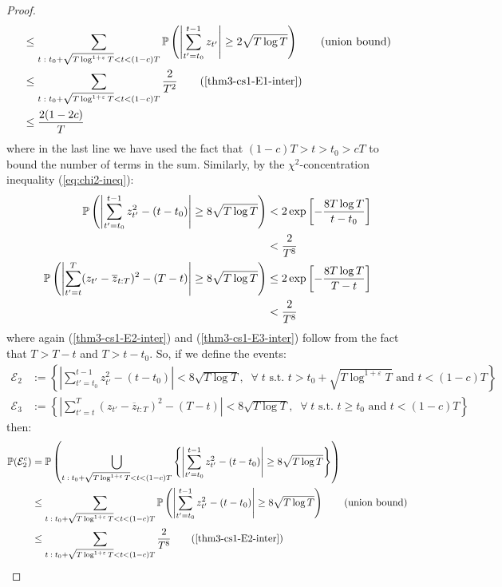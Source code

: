 \documentclass{article}
\newcommand{\sforall}{\;\forall\;}
\begin{document}
\begin{proof}
\begin{align*}
    &\leq \sum_{t\;:\; t_0 + \sqrt{T\log^{1+\varepsilon}T} < t < (1-c)T} \mathbb{P}\left(\left|\sum_{t'=t_0}^{t-1} z_{t'}\right| \geq 2\sqrt{T \log T}\right) \tag{union bound}\\
    &\leq \sum_{t\;:\; t_0 + \sqrt{T\log^{1+\varepsilon}T} < t < (1-c)T} \frac{2}{T^2} \tag{\ref{thm3-cs1-E1-inter}} \\
    &\leq \frac{2(1-2c)}{T}
\end{align*}
where in the last line we have used the fact that $(1-c)T > t > t_0 > cT$ to bound the number of terms in the sum. Similarly, by the $\chi^2$-concentration inequality (\ref{eq:chi2-ineq}):
\begin{align}
    \mathbb{P}\left(\left|\sum_{t'=t_0}^{t-1} z^2_{t'} - (t -t_0)\right| \geq 8\sqrt{T \log T}\right) &< 2 \exp\left[- 
    \frac{8 T \log T}{t-t_0} \right] \notag\\
    &<  \frac{2}{T^8} \label{thm3-cs1-E2-inter}\\
    \mathbb{P}\left(\left|\sum_{t'=t}^T (z_{t'} - \overline{z}_{t:T})^2 - (T-t)\right| \geq 8\sqrt{T \log T}\right) &\leq 2 \exp\left[-\frac{8 T \log T}{T-t} \right] \notag \\
    &<  \frac{2}{T^8} \label{thm3-cs1-E3-inter}
\end{align}
where again (\ref{thm3-cs1-E2-inter}) and (\ref{thm3-cs1-E3-inter}) follow from the fact that $T > T - t$ and $T > t-t_0$. So, if we define the events:
\begin{align*}
    \mathcal{E}_2 &:= \left\{\left|\sum_{t'=t_0}^{t-1} z^2_{t'} - (t -t_0)\right| < 8\sqrt{T \log T}, \; \sforall t \text{ s.t. } t > t_0 + \sqrt{T\log^{1+\varepsilon}T} \text{ and } t < (1-c)T\right\} \\
    \mathcal{E}_3 &:= \left\{\left|\sum_{t'=t}^T (z_{t'} - \overline{z}_{t:T})^2 - (T-t)\right| < 8\sqrt{T \log T}, \; \sforall t \text{ s.t. } t \geq t_0 \text{ and } t < (1-c)T\right\}
\end{align*}
then:
\begin{align*}
    \mathbb{P}(\mathcal{E}^c_2) &= \mathbb{P}\left(\bigcup_{t\;:\; t_0 + \sqrt{T\log^{1+\varepsilon}T} < t < (1-c)T} \left\{\left|\sum_{t'=t_0}^{t-1} z^2_{t'} - (t -t_0)\right| \geq 8\sqrt{T \log T}\right\}\right) \\
    &\leq \sum_{t\;:\; t_0 + \sqrt{T\log^{1+\varepsilon}T} < t < (1-c)T} \mathbb{P}\left(\left|\sum_{t'=t_0}^{t-1} z^2_{t'} - (t -t_0)\right| \geq 8\sqrt{T \log T}\right) \tag{union bound}\\
    &\leq \sum_{t\;:\; t_0 + \sqrt{T\log^{1+\varepsilon}T} < t < (1-c)T} \frac{2}{T^8} \tag{\ref{thm3-cs1-E2-inter}} \\

\end{align*}
\end{proof}
\end{document}
